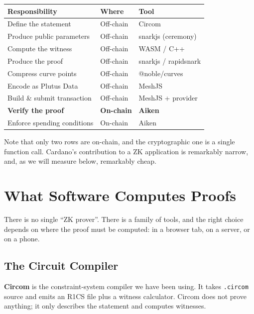 \begin{center}
\begin{tabular}{lll}
  \hline
  \textbf{Responsibility}       & \textbf{Where}  & \textbf{Tool} \\
  \hline
  Define the statement          & Off-chain       & Circom \\
  Produce public parameters     & Off-chain       & snarkjs (ceremony) \\
  Compute the witness           & Off-chain       & WASM / C++ \\
  Produce the proof             & Off-chain       & snarkjs / rapidsnark \\
  Compress curve points         & Off-chain       & @noble/curves \\
  Encode as Plutus Data         & Off-chain       & MeshJS \\
  Build \& submit transaction   & Off-chain       & MeshJS + provider \\
  \textbf{Verify the proof}     & \textbf{On-chain} & \textbf{Aiken} \\
  Enforce spending conditions   & On-chain        & Aiken \\
  \hline
\end{tabular}
\end{center}

Note that only two rows are on-chain, and the cryptographic one is a single
function call. Cardano's contribution to a ZK application is remarkably
narrow, and, as we will measure below, remarkably cheap.

\section{What Software Computes Proofs} \label{sec:ch7-provers}

There is no single ``ZK prover''. There is a family of tools, and the right
choice depends on where the proof must be computed: in a browser tab, on a
server, or on a phone.

\subsection*{The Circuit Compiler}

\textbf{Circom} is the constraint-system compiler we have been using. It takes
\texttt{.circom} source and emits an R1CS file plus a witness calculator. Circom
does not prove anything; it only describes the statement and computes witnesses.

